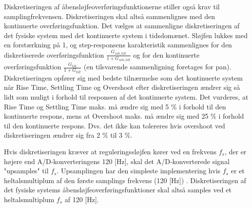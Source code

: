 Diskretiseringen af åbensløjfeoverføringsfunktionerne stiller også krav til samplingfrekvensen.
Diskretiseringen skal altså sammenlignes med den kontinuerte overføringsfunktion.
Det vælges at sammenligne diskretiseringen af det fysiske system med det kontinuerte system i tidsdomænet.
Sløjfen lukkes med en forstærkning på 1, og step-responsens karakteristik sammenlignes
for den diskretiserede overføringsfunktion \(\frac{G_{zoh,tilt}}{1+G_{zoh,tilt}}\)
og for den kontinuerte overføringsfunktion \(\frac{G_{tilt}}{1+G_{tilt}}\) (en tilsvarende sammenligning foretages for pan).
Diskretiseringen opfører sig med bedste tilnærmelse som det kontinuerte system
når Rise Time, Settling Time og Overshoot efter diskretiseringen
ændrer sig så lidt som muligt i forhold til responsen af det kontinuerte system.
Det vurderes, at Rise Time og Settling Time maks. må ændre sig med 5 \% i forhold
til den kontinuerte respons, mens at Overshoot maks. må ændre sig med 25 \% i forhold til
den kontinuerte respons.
Dvs. det ikke kan tolereres hvis overshoot
ved diskretiseringen ændrer sig fra 2 \% til 3 \%.

Hvis diskretiseringen kræver at reguleringssløjfen kører ved en frekvens \(f_s\),
der er højere end A/D-konverteringens 120 [Hz], skal det A/D-konverterede
signal "upsamples" til \(f_s\).
Upsamplingen har den simpleste implementering
hvis \(f_s\) er et heltalsmultiplum af den første samplings frekvens (120 [Hz]) \citep[s. 562]{dsp}.
Diskretiseringen af det fysiske systems åbensløjfeoverføringsfunktioner skal altså samples ved et heltalsmultiplum \(f_s\) af 120 [Hz].

